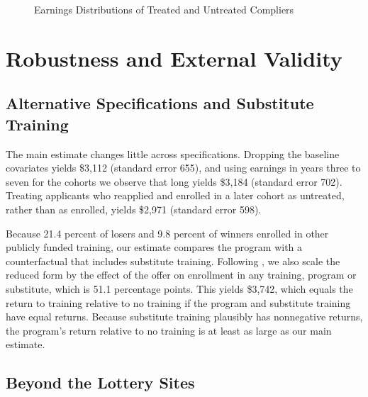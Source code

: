 \documentclass[12pt]{article}
\begin{document}
\begin{figure}[htbp]
\centering
{}
\caption{Earnings Distributions of Treated and Untreated Compliers}
\label{fig:distribution}
\end{figure}

\section{Robustness and External Validity}\label{sec:robust}

\subsection{Alternative Specifications and Substitute Training}

The main estimate changes little across specifications. Dropping the baseline covariates yields \$3,112 (standard error 655), and using earnings in years three to seven for the cohorts we observe that long yields \$3,184 (standard error 702). Treating applicants who reapplied and enrolled in a later cohort as untreated, rather than as enrolled, yields \$2,971 (standard error 598).

Because 21.4 percent of losers and 9.8 percent of winners enrolled in other publicly funded training, our estimate compares the program with a counterfactual that includes substitute training. Following \citet{klinewalters2016}, we also scale the reduced form by the effect of the offer on enrollment in any training, program or substitute, which is 51.1 percentage points. This yields \$3,742, which equals the return to training relative to no training if the program and substitute training have equal returns. Because substitute training plausibly has nonnegative returns, the program's return relative to no training is at least as large as our main estimate.

\subsection{Beyond the Lottery Sites}
\end{document}
